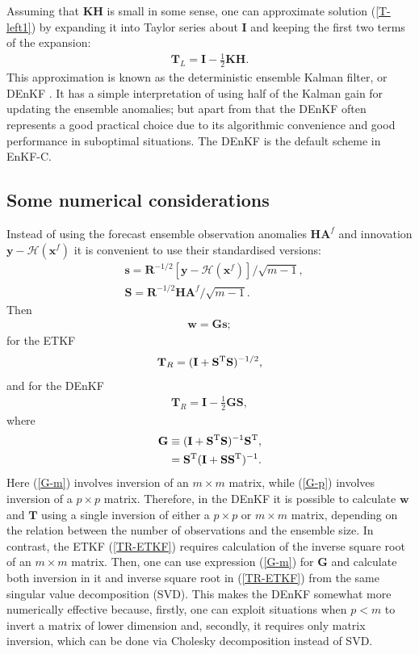 \documentclass[11pt]{report}
\newcommand{\mb} {\mathbf}
\newcommand{\T}{^{\tiny \mathrm T}}
\begin{document}
Assuming that $\mb K \mb H$ is small in some sense, one can approximate solution (\ref{T-left1}) by expanding it into Taylor series about $\mb I$ and keeping the first two terms of the expansion:
\begin{align}
  \label{denkf}
  \mb T_L = \mb I - \frac{1}{2} \mb K \mb H.
\end{align}
This approximation is known as the deterministic ensemble Kalman filter, or DEnKF \citep{sak08a}.
It has a simple interpretation of using half of the Kalman gain for updating the ensemble anomalies; but apart from that the DEnKF often represents a good practical choice due to its algorithmic convenience and good performance in suboptimal situations.
The DEnKF is the default scheme in EnKF-C.

\subsection{Some numerical considerations}
\label{sec:numerical}

Instead of using the forecast ensemble observation anomalies $\mb H \mb A^f$ and innovation $\mb y - \mathcal H(\mb x^f)$ it is convenient to use their standardised versions:
\begin{align}
  \label{s}
  &\mb s = \mb R^{-1/2} \left[ \mb y - \mathcal H(\mb x^f) \right] / \sqrt{m - 1},\\
  \label{S}
  &\mb S = \mb R^{-1/2} \mb H \mb A^f / \sqrt{m - 1}.
\end{align}
Then
\begin{align}
  \mb w = \mb G \mb s;
\end{align}
for the ETKF
\begin{align}
  \label{TR-ETKF}
  \mb T_R = (\mb I + \mb S\T \mb S)^{-1/2},
\end{align}
and for the DEnKF
\begin{align}
  \label{TR-DEnKF}
  \mb T_R = \mb I - \frac{1}{2} \mb G \mb S,
\end{align}
where
\begin{align}
  \label{G-m}
  \mb G &\equiv (\mb I + \mb S\T \mb S)^{-1} \mb S\T,\\
  \label{G-p}
  & = \mb S\T ( \mb I + \mb S \mb S\T)^{-1}.
\end{align}
Here (\ref{G-m}) involves inversion of an $m \times m$ matrix, while (\ref{G-p}) involves inversion of a $p \times p$ matrix.
Therefore, in the DEnKF it is possible to calculate $\mb w$ and $\mb T$ using a single inversion of either a $p \times p$ or $m \times m$ matrix, depending on the relation between the number of observations and the ensemble size.
In contrast, the ETKF (\ref{TR-ETKF}) requires calculation of the inverse square root of an $m \times m$ matrix.
Then, one can use expression (\ref{G-m}) for $\mb G$ and calculate both inversion in it and inverse square root in (\ref{TR-ETKF}) from the same singular value decomposition (SVD).
This makes the DEnKF somewhat more numerically effective because, firstly, one can exploit situations when $p < m$ to invert a matrix of lower dimension and, secondly, it requires only matrix inversion, which can be done via Cholesky decomposition instead of SVD.
\end{document}
